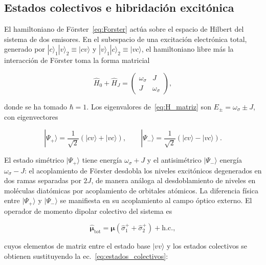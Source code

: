 \subsection{Estados colectivos e hibridación excitónica}
\label{sec:estados_colectivos}

El hamiltoniano de Förster~\eqref{eq:Forster} actúa sobre el espacio de Hilbert del sistema de dos emisores. En el subespacio de una excitación electrónica total, generado por $|c\rangle_1|v\rangle_2 \equiv |cv\rangle$ y $|v\rangle_1|c\rangle_2 \equiv |vc\rangle$, el hamiltoniano libre más la interacción de Förster toma la forma matricial

\begin{equation}
	\hat{H}_0 + \hat{H}_J =
	\begin{pmatrix}
		\omega_\sigma & J \\
		J & \omega_\sigma
	\end{pmatrix},
	\label{eq:H_matriz}
\end{equation}

donde se ha tomado $\hbar = 1$. Los eigenvalores de~\eqref{eq:H_matriz} son $E_\pm = \omega_\sigma \pm J$, con eigenvectores

\begin{equation}
	|\Psi_+\rangle = \frac{1}{\sqrt{2}}\left(|cv\rangle +
	|vc\rangle\right), \qquad
	|\Psi_-\rangle = \frac{1}{\sqrt{2}}\left(|cv\rangle -
	|vc\rangle\right).
	\label{eq:estados_colectivos}
\end{equation}

El estado simétrico $|\Psi_+\rangle$ tiene energía $\omega_\sigma + J$ y el antisimétrico $|\Psi_-\rangle$ energía $\omega_\sigma - J$: el acoplamiento de Förster desdobla los niveles excitónicos degenerados en dos ramas separadas por $2J$, de manera análoga al desdoblamiento de niveles en moléculas diatómicas por acoplamiento de orbitales atómicos. La diferencia física entre $|\Psi_+\rangle$ y $|\Psi_-\rangle$ se manifiesta en su acoplamiento al campo óptico externo. El operador de momento dipolar colectivo del sistema es

\begin{equation}
	\hat{\boldsymbol{\mu}}_\text{tot} = \boldsymbol{\mu}
	\left(\hat{\sigma}_1^+ + \hat{\sigma}_2^+\right) + \text{h.c.},
	\label{eq:dipolo_colectivo}
\end{equation}

cuyos elementos de matriz entre el estado base $|vv\rangle$ y los estados colectivos se obtienen sustituyendo la ec.~\eqref{eq:estados_colectivos}:

